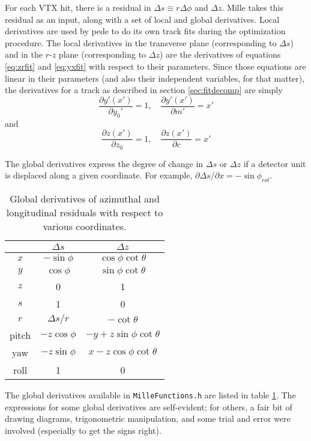 \documentclass[12pt]{article}
\begin{document}
For each VTX hit, there is a residual in $\Delta s \equiv r\Delta\phi$ and $\Delta z$. Mille takes this residual as an input, along with a set of local and global derivatives. Local derivatives are used by pede to do its own track fits during the optimization procedure. The local derivatives in the transverse plane (corresponding to $\Delta s$) and in the $r$-$z$ plane (corresponding to $\Delta z$) are the derivatives of equations \ref{eq:zrfit} and \ref{eq:yxfit} with respect to their parameters. Since those equations are linear in their parameters (and also their independent variables, for that matter), the derivatives for a track as described in section \ref{sec:fitdecomp} are simply
\begin{equation} \label{eq:sderlc}
\frac{\partial y'(x')}{\partial y_0'} = 1, \quad 
\frac{\partial y'(x')}{\partial m'} = x' 
\end{equation}
and
\begin{equation} \label{eq:zderlc}
\frac{\partial z(x')}{\partial z_0} = 1, \quad 
\frac{\partial z(x')}{\partial c} = x' 
\end{equation}

The global derivatives express the degree of change in $\Delta s$ or $\Delta z$ if a detector unit is displaced along a given coordinate. For example, $\partial \Delta s / \partial x = -\sin \phi_{rot}$. 
\begin{table}[htb!]
\centering
\begin{tabular}{c | c | c }
 & $\Delta s$ & $\Delta z$ \\
\hline
$x$ & $-\sin \phi$ & $\cos \phi \cot \theta$ \\
$y$ & $ \cos \phi$ & $\sin \phi \cot \theta$ \\
$z$ & 0 & 1 \\
$s$ & 1 & 0 \\
$r$ & $\Delta s / r$ & $-\cot \theta$ \\
pitch & $-z \cos \phi$ & $-y + z \sin \phi \cot \theta$ \\
yaw & $-z \sin \phi$ & $x - z \cos \phi \cot \theta$ \\
roll & 1 & 0 \\
\hline
\end{tabular}
\caption{Global derivatives of azimuthal and longitudinal residuals with respect to various coordinates.}
\label{tab:dergl}
\end{table}
The global derivatives available in \texttt{MilleFunctions.h} are listed in table \ref{tab:dergl}. The expressions for some global derivatives are self-evident; for others, a fair bit of drawing diagrams, trigonometric manipulation, and some trial and error were involved (especially to get the signs right).
\end{document}
